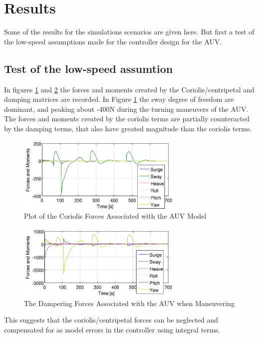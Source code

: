 \section{Results}
	Some of the results for the simulations scenarios are given here. But first a test of the low-speed
	assumptions made for the controller design for the AUV. 

	\subsection{Test of the low-speed assumtion}
		In figures \ref{fig:ch3_coriolis_forces} and \ref{fig:ch3_damping_forces} the forces and
		moments created by the Coriolis/centripetal and damping matrices are recorded. In Figure
		\ref{fig:ch3_coriolis_forces} the sway degree of freedom are dominant, and peaking about
		-400N during the turning maneuvers of the AUV. The forces and moments created by the coriolis
		terms are partially counteracted by the damping terms, that also have greated magnitude than
		the coriolis terms.
		\begin{figure}[htbp]
			\centering
			\includegraphics[width=0.7\textwidth]{pics/coriolis_forces}
			\caption{Plot of the Coriolis Forces Associated with the AUV Model}
			\label{fig:ch3_coriolis_forces}
		\end{figure}		
		\begin{figure}[htbp]
			\centering
			\includegraphics[width=0.7\textwidth]{pics/damping_forces}
			\caption{The Dampering Forces Associated with the AUV when Maneuvering}
			\label{fig:ch3_damping_forces}
		\end{figure}
		This suggests that the coriolis/centripetal forces can be neglected and compensated for as
		model errors in the controller using integral terms.  


